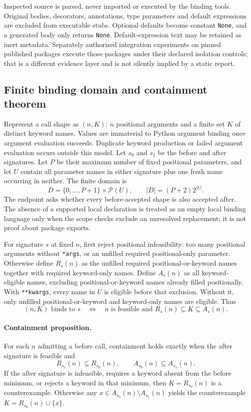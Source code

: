 Inspected source is parsed, never imported or executed by the binding tools.
Original bodies, decorators, annotations, type parameters and default
expressions are excluded from executable stubs. Optional defaults become
constant \texttt{None}, and a generated body only returns \texttt{None}.
Default-expression text may be retained as inert metadata. Separately
authorized integration experiments on pinned published packages execute
those packages under their declared isolation controls; that is a different
evidence layer and is not silently implied by a static report.

\subsection{Finite binding domain and containment theorem}

Represent a call shape as $(n,K)$: $n$ positional arguments and a finite set
$K$ of distinct keyword names. Values are immaterial to Python argument
binding once argument evaluation succeeds. Duplicate keyword production or
failed argument evaluation occurs outside this model.
Let $s_0$ and $s_1$ be the before and after signatures. Let $P$ be their maximum
number of fixed positional parameters, and let $U$ contain all parameter
names in either signature plus one fresh name occurring in neither.
The finite domain is
\[
  D = \{0,\ldots,P+1\}\times\mathcal{P}(U),
  \qquad |D|=(P+2)2^{|U|}.
\]
The endpoint asks whether every before-accepted shape is also accepted after.
The absence of a supported local declaration is treated as an empty local
binding language only when the scope checks exclude an unresolved
replacement; it is not proof about package exports.

For signature $s$ at fixed $n$, first reject positional infeasibility: too
many positional arguments without \texttt{*args}, or an unfilled required
positional-only parameter. Otherwise define $R_s(n)$ as the unfilled required
positional-or-keyword names together with required keyword-only names.
Define $A_s(n)$ as all keyword-eligible names, excluding
positional-or-keyword names already filled positionally. With
\texttt{**kwargs}, every name in $U$ is eligible before that exclusion.
Without it, only unfilled positional-or-keyword and keyword-only names are
eligible. Thus
\[
 (n,K)\text{ binds to }s
 \quad\Longleftrightarrow\quad
 n\text{ is feasible and }R_s(n)\subseteq K\subseteq A_s(n).
\]

\paragraph{Containment proposition.}
For each $n$ admitting a before call, containment holds exactly when the
after signature is feasible and
\[
 R_{s_1}(n)\subseteq R_{s_0}(n),
 \qquad A_{s_0}(n)\subseteq A_{s_1}(n).
\]
If the after signature is infeasible, requires a keyword absent from the
before minimum, or rejects a keyword in that minimum, then
$K=R_{s_0}(n)$ is a counterexample. Otherwise any
$x\in A_{s_0}(n)\setminus A_{s_1}(n)$ yields the counterexample
$K=R_{s_0}(n)\cup\{x\}$.

